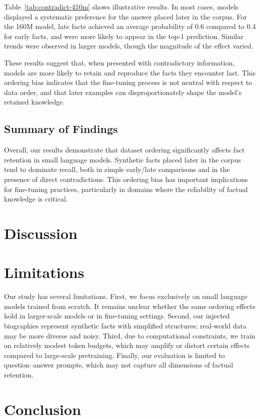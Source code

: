 \documentclass[11pt]{article}
\begin{document}
Table~\ref{tab:contradict-410m} shows illustrative results. In most cases, models displayed a systematic preference for the answer placed later in the corpus. For the 160M model, late facts achieved an average probability of 0.6 compared to 0.4 for early facts, and were more likely to appear in the top-1 prediction. Similar trends were observed in larger models, though the magnitude of the effect varied.

These results suggest that, when presented with contradictory information, models are more likely to retain and reproduce the facts they encounter last. This ordering bias indicates that the fine-tuning process is not neutral with respect to data order, and that later examples can disproportionately shape the model’s retained knowledge.

\subsection{Summary of Findings}
Overall, our results demonstrate that dataset ordering significantly affects fact retention in small language models. Synthetic facts placed later in the corpus tend to dominate recall, both in simple early/late comparisons and in the presence of direct contradictions. This ordering bias has important implications for fine-tuning practices, particularly in domains where the reliability of factual knowledge is critical.




\section{Discussion}

\section{Limitations}
Our study has several limitations. First, we focus exclusively on small language models trained from scratch. It remains unclear whether the same ordering effects hold in larger-scale models or in fine-tuning settings. Second, our injected biographies represent synthetic facts with simplified structures; real-world data may be more diverse and noisy. Third, due to computational constraints, we train on relatively modest token budgets, which may amplify or distort certain effects compared to large-scale pretraining. Finally, our evaluation is limited to question–answer prompts, which may not capture all dimensions of factual retention.

\section{Conclusion}

% 
% 
\end{document}
